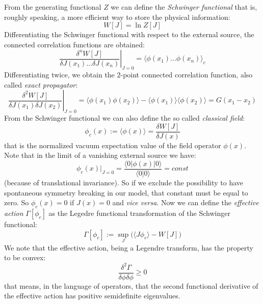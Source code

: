 From the generating functional $Z$ we can define the \emph{Schwinger functional} that is, roughly speaking, a more efficient way to store the physical information:
$$W[J] =  \ln Z[J]$$%
Differentiating the Schwinger functional with respect to the external source, the connected correlation functions are obtained:
\begin{equation}\label{greenconnessa}
\left.\frac{\delta^nW[J]}{\delta J(x_1)\dots \delta J(x_n)}\right|_{J = 0} = \langle\phi(x_1)\dots \phi(x_n)\rangle_c
\end{equation}
Differentiating twice, we obtain the $2$-point connected correlation function, also called \emph{exact propagator}:
\begin{equation}\label{greenconnessa}
\left.\frac{\delta^2W[J]}{\delta J(x_1)\delta J(x_2)}\right|_{J = 0} = \langle\phi(x_1)\phi(x_2)\rangle - \langle\phi(x_1)\rangle\langle\phi(x_2)\rangle = G(x_1 - x_2)
\end{equation}
From the Schwinger functional we can also define the so called \emph{classical field}:
\begin{equation}\label{campoclassico}
 \phi_c (x) := \langle\phi(x)\rangle = \frac{\delta W[J]}{\delta J(x)}
\end{equation}
that is the normalized vacuum expectation value of the  field operator $\phi(x)$. Note that in the limit of a vanishing external source we have:
\begin{equation}\label{phiJzeri}
 \phi_c(x)|_{J=0} = \frac{\langle0|\phi(x)|0\rangle}{\langle0|0\rangle} = const
\end{equation}
(because of translational invariance). So if we exclude the possibility to have spontaneous symmetry breaking in our model, that constant must be equal to zero. 
So $\phi_c(x) =0$ if $J(x) = 0$ and \emph{vice versa}.
Now we can define the \emph{effective action} $\Gamma[\phi_c]$ as the Legedre functional transformation of the Schwinger functional:
\begin{equation}\label{lagamma}
 \Gamma [\phi_c] := \sup_J \Big(\langle J \phi_c  \rangle - W[J]\Big)
\end{equation}
We note that the effective action, being a Legendre transform, has the property to be convex:
\begin{equation}
\frac{\delta^2 \Gamma}{\delta\phi \delta\phi} \geq 0
\end{equation}
that means, in the language of operators, that the second functional derivative of the effective action has positive semidefinite eigenvalues.
